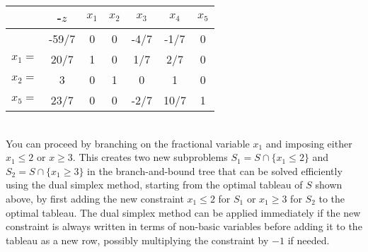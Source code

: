 \vspace{5pt}

\renewcommand{\arraystretch}{1.2}
\setlength{\tabcolsep}{8pt}

\begin{minipage}{0.72\textwidth}
\begin{tabular}{r|c|ccccc}
       & -$z$  & $x_1$ & $x_2$ & $x_3$ & $x_4$ & $x_5$\\
     \hline
       & -59/7 & 0     & 0     & -4/7  & -1/7  & 0\\
     \hline
$x_1=$ & 20/7 & 1     & 0     &  1/7  & 2/7   & 0\\
$x_2=$ &  3   & 0     & 1     &  0    &  1    & 0\\
$x_5=$ & 23/7 & 0     & 0     & -2/7  & 10/7  & 1 
\end{tabular}
\end{minipage}
\begin{minipage}{0.23\textwidth}
\footnotesize
{}
\end{minipage}\\[5pt]

You can proceed by branching on the fractional variable $x_1$ and imposing either $x_1\leq 2$ or $x\geq 3$. This creates two new subproblems $S_1 = S\cap \{x_1\leq 2\}$ and $S_2 = S\cap \{x_1\geq 3\}$ in the branch-and-bound tree that can be solved efficiently using the dual simplex method, starting from the optimal tableau of $S$ shown above, by first adding the new constraint $x_1\leq 2$ for $S_1$ or $x_1\geq 3$ for $S_2$ to the optimal tableau. The dual simplex method can be applied immediately if the new constraint is always written in terms of non-basic variables before adding it to the tableau as a new row, possibly multiplying the constraint by $-1$ if needed. 